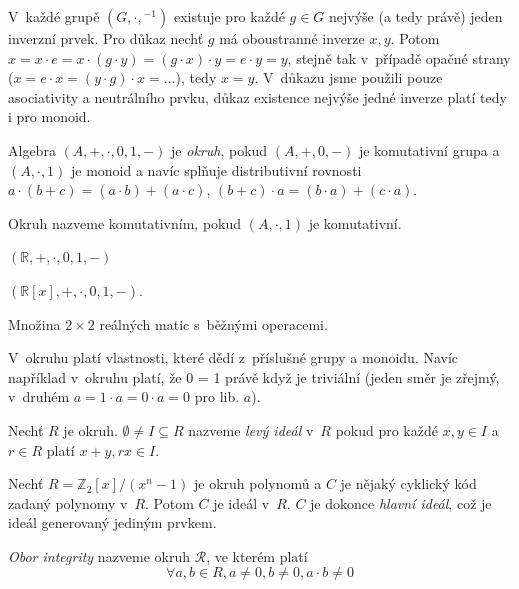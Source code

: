 V~každé grupě $(G, \cdot, {^{-1}})$ existuje pro každé $g \in G$ nejvýše
(a tedy právě) jeden inverzní prvek.
Pro důkaz nechť $g$ má oboustranné inverze $x,y$.
Potom $x = x \cdot e = x \cdot (g \cdot y) = (g \cdot x) \cdot y
= e \cdot y = y$, stejně tak v~případě opačné strany
($x = e \cdot x = (y \cdot g) \cdot x =\ldots$),
tedy $x = y$. V~důkazu jsme použili pouze asociativity a neutrálního
prvku, důkaz existence nejvýše jedné inverze platí tedy i pro monoid.


\begin{definition}[Okruh]
    Algebra $(A, +, \cdot, 0, 1, -)$ je {\em okruh}, pokud
    $(A, +, 0, -)$ je komutativní grupa
    a $(A, \cdot, 1)$ je monoid
    a navíc splňuje distributivní rovnosti
    $a \cdot (b + c) = (a \cdot b) + (a \cdot c)$,
    $(b + c) \cdot a = (b \cdot a) + (c \cdot a)$.

    Okruh nazveme komutativním, pokud $(A, \cdot, 1)$ je komutativní.
\end{definition}

\begin{example}
    $(\mathbb{R}, +, \cdot, 0, 1, -)$
\end{example}

\begin{example}
$(\mathbb{R}[x], +, \cdot, 0, 1, -)$.
\end{example}

\begin{example}
    Množina $2 \times 2$ reálných matic s~běžnými operacemi.
\end{example}

V~okruhu platí vlastnosti, které dědí z~příslušné grupy a monoidu.
Navíc například v~okruhu platí, že 0 = 1 právě když je triviální (jeden
směr je zřejmý, v~druhém $a = 1 \cdot a = 0 \cdot a = 0$ pro lib. $a$).

\begin{definition}
    Nechť $R$ je okruh.
    $\emptyset \neq I \subseteq R$ nazveme {\em levý ideál} v~$R$
    pokud pro každé $x,y \in I$ a $r \in R$ platí
    $x + y, rx \in I$.
\end{definition}

\begin{example}
    Nechť $R = \mathbb{Z}_2[x] / (x^n - 1)$ je okruh polynomů
    a $C$ je nějaký cyklický kód zadaný polynomy v~$R$.
    Potom $C$ je ideál v~$R$.
    $C$ je dokonce {\em hlavní ideál}, což je ideál generovaný jediným prvkem.
\end{example}

\begin{definition}
    {\em Obor integrity} nazveme okruh $\mathcal{R}$, ve kterém platí
    \[
        \forall a,b \in R, a \neq 0, b \neq 0, a \cdot b \neq 0
    \]
\end{definition}



